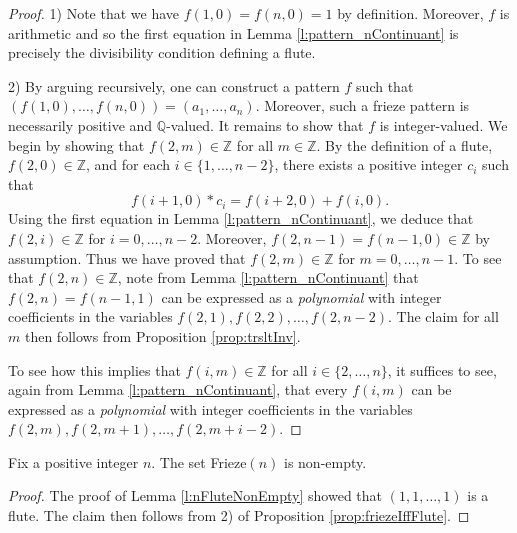 \begin{proof}
    1) Note that we have $f(1,0) = f(n,0) = 1$ by definition. Moreover, $f$ is arithmetic and so the first 
    equation in Lemma \ref{l:pattern_nContinuant} is precisely the divisibility condition defining a flute.

    2) By arguing recursively, one can construct a pattern $f$ such that $ (f (1,0), \ldots, f (n,0)) = (a_1, \ldots, a_n)$. 
    Moreover, such a frieze pattern is necessarily positive and $\mathbb{Q}$-valued. It remains to show that $f$ is integer-valued. 
    We begin by showing that $f (2,m) \in \mathbb{Z}$ for all $m \in \mathbb{Z}$. 
    By the definition of a flute, $f (2,0) \in \mathbb{Z}$, and for each 
    $i \in \{1,\ldots, n-2\}$, there exists a positive integer $c_i$ such that
    \[
        f(i+1,0) * c_i = f (i+2,0) + f (i,0).    
    \]
    Using the first equation in Lemma \ref{l:pattern_nContinuant}, we deduce that $f(2,i) \in \mathbb{Z}$ for $i =0, \ldots, n-2$. 
    Moreover, $ f (2,n-1) = f (n-1,0) \in \mathbb{Z}$ by assumption. Thus we have proved that 
    $f (2,m) \in \mathbb{Z}$ for $m = 0, \ldots, n-1$. To see that $f (2,n) \in \mathbb{Z}$, note from 
    Lemma \ref{l:pattern_nContinuant} that $f (2,n) = f (n-1,1)$ can be expressed as a {\it polynomial} with 
    integer coefficients in the variables $f (2,1), f (2,2),\ldots , f (2,n-2)$. The claim for all $m$ then follows from 
    Proposition \ref{prop:trsltInv}. 

    To see how this implies that $f (i,m) \in \mathbb{Z}$ for all $i \in \{2, \ldots, n\}$, it suffices to 
    see, again from Lemma \ref{l:pattern_nContinuant}, that every $f (i,m)$ can be expressed as a {\it polynomial} with 
    integer coefficients in the variables $f (2,m), f (2,m+1),\ldots , f (2,m+i-2)$.

\end{proof}

\begin{corollary}
    \label{c:arithFriezePatSetNonEmpty}
    \leanok
    Fix a positive integer $n$. The set Frieze$(n)$ is non-empty.
\end{corollary}
\begin{proof}
    The proof of Lemma \ref{l:nFluteNonEmpty} showed that $(1,1,\ldots, 1)$ is a flute. 
    The claim then follows from 2) of Proposition \ref{prop:friezeIffFlute}.
\end{proof}

